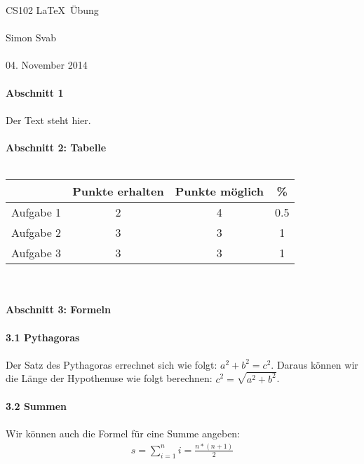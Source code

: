 \documentclass{article}
\begin{document}
\centering \huge CS102 \LaTeX \ {\"U}bung
\\ \
\\ \huge Simon Svab \large
\\ \
\\ \LARGE 04. November 2014 \large
\\ \
\\ \Large \flushleft \textbf{Abschnitt 1}
\\ \
\\ \large Der Text steht hier.
\\ \
\\ \Large \textbf{Abschnitt 2: Tabelle}
\\ \ \centering
\\ \begin{tabular}{c | c | c | c} 
  \ & Punkte erhalten & Punkte m{\"o}glich & \% \\
  \hline
  Aufgabe 1 & 2 & 4 & 0.5 \\
  Aufgabe 2 & 3 & 3 & 1 \\
  Aufgabe 3 & 3 & 3 & 1 \\
 \end{tabular}
\\ \
\\ \flushleft \textbf{Abschnitt 3: Formeln}
\\ \
\\ \Large \textbf{3.1 Pythagoras} \large
\\ \
\\ \large Der Satz des Pythagoras errechnet sich wie folgt: $a^2 + b^2 = c^2$.
Daraus k{\"o}nnen wir die L{\"a}nge der Hypothenuse wie folgt berechnen: $c^2 = \sqrt {a^2+b^2}$.
\\ \
\\ \Large \textbf{3.2 Summen} \large
\\ \
\\ Wir k{\"o}nnen auch die Formel f{\"u}r eine Summe angeben: \begin{align}
s = \sum\limits_{i=1}^n i = \frac{n * (n+1)}{2}
\end{align}
\end{document}
